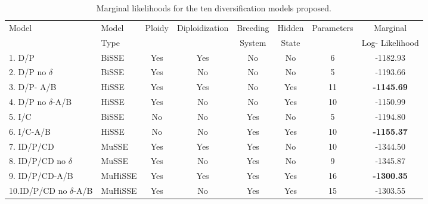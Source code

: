 \begin{table}
\begin{tabular}{@{}llcccccc@{}} \toprule
Model& Model& Ploidy & Diploidization & Breeding  & Hidden & Parameters & Marginal \\
& Type & &  &System & State & & Log- Likelihood \\
1. D/P &BiSSE &	Yes  &	Yes &	No	&No	& 6	& -1182.93 \\
2. D/P no $\delta$ & BiSSE  &	Yes & 	No	& No	& No & 	5 &	-1193.66\\
3. D/P- A/B  & HiSSE &	Yes &	Yes	&No &	Yes &	11 &	\textbf{-1145.69}\\
4. D/P no $\delta$-A/B &	HiSSE &	Yes & No &	No &	Yes &	10	&-1150.99\\
5. I/C &	BiSSE &	No &	 No	&Yes &	No &	 5 &  -1194.80 \\
6. I/C-A/B &	HiSSE &	No &	 No	&Yes &	Yes	& 10 & \textbf{-1155.37}\\
7. ID/P/CD & MuSSE &	Yes & 	Yes &	Yes &	No &	10 & -1344.50\\
8. ID/P/CD no $\delta$ &	MuSSE &	Yes & 	No &	Yes	&No &	9 &-1345.87\\
9. ID/P/CD-A/B & MuHiSSE &	Yes 	&Yes &	Yes &	Yes &	16 & \textbf{-1300.35} \\
10.ID/P/CD no $\delta$-A/B &	 MuHiSSE	 & Yes & 	No	&Yes &	Yes	&15 &-1303.55 \\ \bottomrule
\end{tabular}
\caption{Marginal likelihoods for the ten diversification models proposed.}
\label{table:marginallike}
\end{table}

